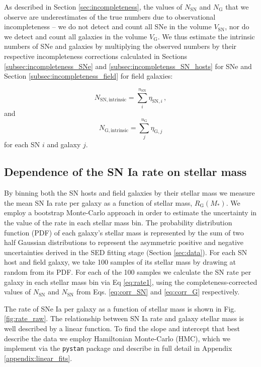 \documentclass[fleqn,usenatbib]{mnras}
\begin{document}
As described in Section \ref{sec:incompleteness}, the values of $N_{\mathrm{SN}}$ and $N_{\mathrm{G}}$ that we observe are underestimates of the true numbers due to observational incompleteness -- we do not detect and count all SNe in the volume $V_{\mathrm{SN}}$, nor do we detect and count all galaxies in the volume $V_{\mathrm{G}}$. We thus estimate the intrinsic numbers of SNe and galaxies by multiplying the observed numbers by their respective incompleteness corrections calculated in Sections \ref{subsec:incompleteness_SNe} and \ref{subsec:incompletenss_SN_hosts} for SNe and Section \ref{subsec:incompleteness_field} for field galaxies:

\begin{equation}
    N_{\mathrm{SN,intrinsic}} = \sum_i^{n_{\mathrm{SN}}}\eta_{\mathrm{SN,}i}\,,
    \label{eq:corr_SN}
\end{equation}
and
\begin{equation}
    N_{\mathrm{G,intrinsic}} = \sum_j^{n_{\mathrm{G}}} \eta_{\mathrm{G,}j} 
    \label{eq:corr_G}
\end{equation}
for each SN $i$ and galaxy $j$.

\subsection{Dependence of the SN Ia rate on stellar mass \label{subsec:rates_mass}}

By binning both the SN hosts and field galaxies by their stellar mass we measure the mean SN Ia rate per galaxy as a function of stellar mass, $R_{\mathrm{G}}(M_*)$. We employ a bootstrap Monte-Carlo approach in order to estimate the uncertainty in the value of the rate in each stellar mass bin. The probability distribution function (PDF) of each galaxy's stellar mass is represented by the sum of two half Gaussian distributions to represent the asymmetric positive and negative uncertainties derived in the SED fitting stage (Section \ref{sec:data}). For each SN host and field galaxy, we take 100 samples of its stellar mass by drawing at random from its PDF. For each of the 100 samples we calculate the SN rate per galaxy in each stellar mass bin via Eq \ref{eq:rate1}, using the completeness-corrected values of $N_{\mathrm{SN}}$ and $N_{\mathrm{SN}}$ from Eqs. \ref{eq:corr_SN} and \ref{eq:corr_G} respectively. 

The rate of SNe Ia per galaxy as a function of stellar mass is shown in Fig. \ref{fig:rate_raw}. The relationship between SN Ia rate and galaxy stellar mass is well described by a linear function. To find the slope and intercept that best describe the data we employ Hamiltonian Monte-Carlo (HMC), which we implement via the \texttt{pystan} package and describe in full detail in Appendix \ref{appendix:linear_fits}. 
\end{document}

